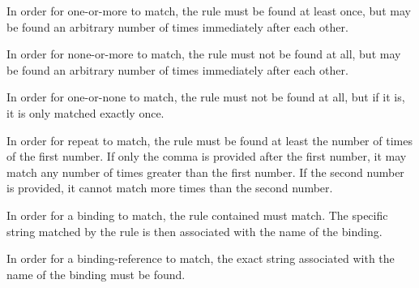 \noindent In order for one-or-more to match, the rule must be found at least once, but may be found an arbitrary number of times immediately after each other.

\noindent In order for none-or-more to match, the rule must not be found at all, but may be found an arbitrary number of times immediately after each other.

\noindent In order for one-or-none to match, the rule must not be found at all, but if it is, it is only matched exactly once.

\noindent In order for repeat to match, the rule must be found at least the number of times of the first number. If only the comma is provided after the first number, it may match any number of times greater than the first number. If the second number is provided, it cannot match more times than the second number.

\noindent In order for a binding to match, the rule contained must match. The specific string matched by the rule is then associated with the name of the binding.

\noindent In order for a binding-reference to match, the exact string associated with the name of the binding must be found.

